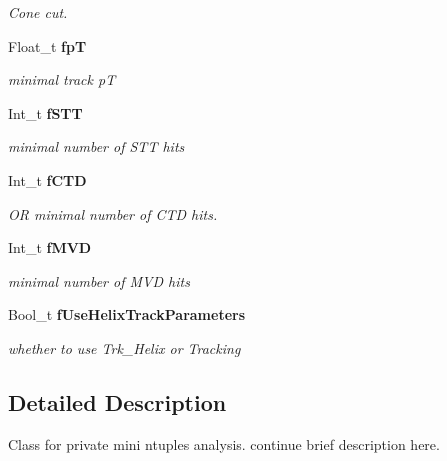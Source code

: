 \begin{CompactItemize}
\begin{CompactList}\small\item\em Cone cut. \item\end{CompactList}\item 
Float\_\-t \bf{fp\-T}\label{classTMiniNtupleAnalyzer_6f9774ed3f9991032746042e57a616bd}

\begin{CompactList}\small\item\em minimal track p\-T \item\end{CompactList}\item 
Int\_\-t \bf{f\-STT}\label{classTMiniNtupleAnalyzer_124e5bb0ca6cbd356d9d335ed5722a35}

\begin{CompactList}\small\item\em minimal number of STT hits \item\end{CompactList}\item 
Int\_\-t \bf{f\-CTD}\label{classTMiniNtupleAnalyzer_958ea86244f6d80df4bb39f575a892cf}

\begin{CompactList}\small\item\em OR minimal number of CTD hits. \item\end{CompactList}\item 
Int\_\-t \bf{f\-MVD}\label{classTMiniNtupleAnalyzer_a21747d03ef6eea83319922a9c221fe0}

\begin{CompactList}\small\item\em minimal number of MVD hits \item\end{CompactList}\item 
Bool\_\-t \bf{f\-Use\-Helix\-Track\-Parameters}\label{classTMiniNtupleAnalyzer_b45bcc3aa0973e98679a79e1c07d0bdc}

\begin{CompactList}\small\item\em whether to use Trk\_\-Helix or Tracking \item\end{CompactList}\end{CompactItemize}


\subsection{Detailed Description}
Class for private mini ntuples analysis. continue brief description here. 

